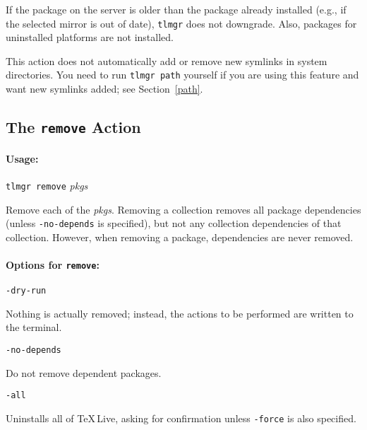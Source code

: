 \documentclass[11pt]{article}
\begin{document}
\noindent
If the package on the server is older than the package
already installed (e.g., if the selected mirror is out of
date), \texttt{tlmgr} does not downgrade. Also, packages for
uninstalled platforms are not installed.

This action does not automatically add or remove
new symlinks in system directories. You need to run
\texttt{tlmgr path} yourself if you are using this feature
and want new symlinks added; see Section~\ref{path}.

\clearpage

\subsection{The {\tt remove} Action}
\label{remove}

\paragraph{Usage:}
\begin{list}{}{}
\item  \texttt{tlmgr remove} \textsl{pkgs}
\end{list}

Remove each of the \textsl{pkgs}. Removing a collection
removes all package dependencies (unless \texttt{-no-depends}
is specified), but not any collection dependencies of that
collection. However, when removing a package, dependencies
are never removed.



\paragraph{Options for \mdseries\texttt{remove}:}

\begin{description}

\item\texttt{-dry-run}\par 

Nothing is actually removed; instead, the actions to be
performed are written to the terminal.

\item\texttt{-no-depends}\par 

Do not remove dependent packages.

\item\texttt{-all}\par 

Uninstalls all of \TeX\,Live, asking for confirmation unless
\texttt{-force} is also specified.

\end{description}
\end{document}
